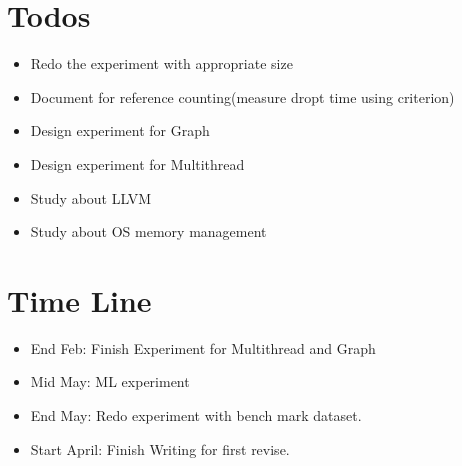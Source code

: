 \section{Todos}
\label{sec:history}
\begin{itemize}
    \item Redo the experiment with appropriate size
    \item Document for reference counting(measure dropt time using criterion)
    \item Design experiment for Graph
    \item Design experiment for Multithread
    \item Study about LLVM
    \item Study about OS memory management
\end{itemize}


\section{Time Line}
\label{sec:history}
\begin{itemize}
    \item End Feb: Finish Experiment for Multithread and Graph
    \item Mid May: ML experiment
    \item End May: Redo experiment with bench mark dataset.
    \item Start April: Finish Writing for first revise.
\end{itemize}


